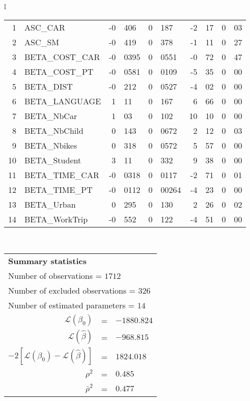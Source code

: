 \begin{tabular}{l}
\begin{tabular}{rlr@{.}lr@{.}lr@{.}lr@{.}l}
1 & ASC_CAR & -0&406 & 0&187 & -2&17 & 0&03\\
2 & ASC_SM & -0&419 & 0&378 & -1&11 & 0&27\\
3 & BETA_COST_CAR & -0&0395 & 0&0551 & -0&72 & 0&47\\
4 & BETA_COST_PT & -0&0581 & 0&0109 & -5&35 & 0&00\\
5 & BETA_DIST & -0&212 & 0&0527 & -4&02 & 0&00\\
6 & BETA_LANGUAGE & 1&11 & 0&167 & 6&66 & 0&00\\
7 & BETA_NbCar & 1&03 & 0&102 & 10&10 & 0&00\\
8 & BETA_NbChild & 0&143 & 0&0672 & 2&12 & 0&03\\
9 & BETA_Nbikes & 0&318 & 0&0572 & 5&57 & 0&00\\
10 & BETA_Student & 3&11 & 0&332 & 9&38 & 0&00\\
11 & BETA_TIME_CAR & -0&0318 & 0&0117 & -2&71 & 0&01\\
12 & BETA_TIME_PT & -0&0112 & 0&00264 & -4&23 & 0&00\\
13 & BETA_Urban & 0&295 & 0&130 & 2&26 & 0&02\\
14 & BETA_WorkTrip & -0&552 & 0&122 & -4&51 & 0&00\\
\hline
\end{tabular}
\\
\begin{tabular}{rcl}
\multicolumn{3}{l}{\bf Summary statistics}\\
\multicolumn{3}{l}{ Number of observations = $1712$} \\
\multicolumn{3}{l}{ Number of excluded observations = $326$} \\
\multicolumn{3}{l}{ Number of estimated  parameters = $14$} \\
 $\mathcal{L}(\beta_0)$ &=&  $-1880.824$ \\
 $\mathcal{L}(\hat{\beta})$ &=& $-968.815 $  \\
 $-2[\mathcal{L}(\beta_0) -\mathcal{L}(\hat{\beta})]$ &=& $1824.018$ \\
    $\rho^2$ &=&   $0.485$ \\
    $\bar{\rho}^2$ &=&    $0.477$ \\
\end{tabular}
  \end{tabular}

